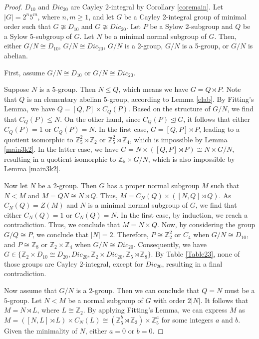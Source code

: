 \documentclass{amsart}
\def \leq {\leqslant}
\def \geq {\geqslant}
\begin{document}
\begin{proof}
$D_{10}$ and $Dic_{20}$ are Cayley 2-integral by Corollary \ref{coremain}. Let $|G|=2^n5^m$, where $n,m\geq 1$, and let $G$ be a Cayley 2-integral group of minimal order such that $G \ncong D_{10}$ and $G \ncong Dic_{20}$. Let $P$ be a Sylow 2-subgroup and $Q$ be a Sylow 5-subgroup of $G$. Let $N$ be a minimal normal subgroup of $G$. Then, either $G/N \cong D_{10}$, $G/N \cong Dic_{20}$, $G/N$ is a 2-group, $G/N$ is a 5-group, or $G/N$ is abelian.

First, assume $G/N \cong D_{10}$ or $G/N \cong Dic_{20}$.

Suppose $N$ is a 5-group. Then $N \leq Q$, which means we have $G = Q \rtimes P$. Note that $Q$ is an elementary abelian 5-group, according to Lemma \ref{elab}. By Fitting's Lemma, we have $Q = [Q, P] \times C_Q(P)$. Based on the structure of $G/N$, we find that $C_Q(P) \leq N$. On the other hand, since $C_Q(P) \unlhd G$, it follows that either $C_Q(P) = 1$ or $C_Q(P) = N$. In the first case, $G = [Q, P] \rtimes P$, leading to a quotient isomorphic to $\mathbb{Z}_5^2 \rtimes \mathbb{Z}_2$ or $\mathbb{Z}_5^2 \rtimes \mathbb{Z}_4$, which is impossible by Lemma \ref{main3k2}. In the latter case, we have $G = N \times ([Q, P] \rtimes P) \cong N \times G/N$, resulting in a quotient isomorphic to $\mathbb{Z}_5 \times G/N$, which is also impossible by Lemma \ref{main3k2}.

Now let $N$ be a 2-group. Then $G$ has a proper normal subgroup $M$ such that $N < M$ and $M = QN \cong N \rtimes Q$. Thus, $M = C_N(Q) \times ([N,Q] \rtimes Q)$. As $C_N(Q) = Z(M)$ and $N$ is a minimal normal subgroup of $G$, we find that either $C_N(Q) = 1$ or $C_N(Q) = N$. In the first case, by induction, we reach a contradiction. Thus, we conclude that $M = N \times Q$. Now, by considering the group $G/Q \cong P$, we conclude that $|N| = 2$. Therefore, $P \cong \mathbb{Z}_2^2$ or $C_4$ when $G/N \cong D_{10}$, and $P \cong \mathbb{Z}_8$ or $\mathbb{Z}_2 \times \mathbb{Z}_4$ when $G/N \cong Dic_{20}$. Consequently, we have $G \in \{ \mathbb{Z}_2 \times D_{10} \cong D_{20}, Dic_{20}, \mathbb{Z}_2 \times Dic_{20}, \mathbb{Z}_5 \rtimes \mathbb{Z}_8 \}$. By Table \ref{Table23}, none of those groups are Cayley 2-integral, except for $Dic_{20}$, resulting in a final contradiction.

Now assume that \(G/N\) is a \(2\)-group. Then we can conclude that \(Q = N\) must be a \(5\)-group. Let \(N < M\) be a normal subgroup of \(G\) with order \(2|N|\). It follows that \(M = N \rtimes L\), where \(L \cong \mathbb{Z}_2\). By applying Fitting's Lemma, we can express \(M\) as \(M = ([N, L] \rtimes L) \times C_N(L) \cong (\mathbb{Z}_5^b \rtimes \mathbb{Z}_2) \times \mathbb{Z}_5^a\) for some integers \(a\) and \(b\). Given the minimality of \(N\), either \(a = 0\) or \(b = 0\).


\end{proof}
\end{document}

